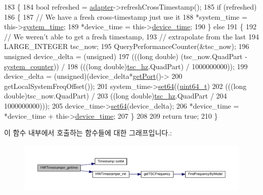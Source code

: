 \begin{DoxyCode}
183 \{
184     \textcolor{keywordtype}{bool} refreshed = \hyperlink{structadapter}{adapter}->refreshCrossTimestamp();
185     \textcolor{keywordflow}{if} (refreshed)
186     \{
187         \textcolor{comment}{// We have a fresh cross-timestamp just use it}
188         *system\_time = this->\hyperlink{class_windows_wireless_timestamper_a12dbc1e510ed1eb316f94c04fcf7d991}{system\_time};
189         *device\_time = this->\hyperlink{class_windows_wireless_timestamper_a095474901dd00b446c5c1b7da2e354aa}{device\_time};
190     \} \textcolor{keywordflow}{else}
191     \{
192         \textcolor{comment}{// We weren't able to get a fresh timestamp,}
193         \textcolor{comment}{// extrapolate from the last}
194         LARGE\_INTEGER tsc\_now;
195         QueryPerformanceCounter(&tsc\_now);
196         \textcolor{keywordtype}{unsigned} device\_delta = (unsigned)
197             (((\textcolor{keywordtype}{long} \textcolor{keywordtype}{double}) (tsc\_now.QuadPart - \hyperlink{class_windows_wireless_timestamper_a6cb20ab38891e33e6db7431f500b1ff1}{system\_counter})) /
198              (((\textcolor{keywordtype}{long} double)\hyperlink{class_windows_wireless_timestamper_a259066718bc34c6231bbefd0b7093b6e}{tsc\_hz}.QuadPart) / 1000000000));
199         device\_delta = (unsigned)(device\_delta*\hyperlink{class_wireless_timestamper_aad42db1d6ccc40f2bebc5ba544d738d8}{getPort}()->
200                       getLocalSystemFreqOffset());
201         system\_time->\hyperlink{class_timestamp_aa62b073d8565fc6536122e8c27351f5c}{set64}((\hyperlink{parse_8c_aec6fcb673ff035718c238c8c9d544c47}{uint64\_t})
202                    (((\textcolor{keywordtype}{long} \textcolor{keywordtype}{double})tsc\_now.QuadPart) /
203                     ((\textcolor{keywordtype}{long} \textcolor{keywordtype}{double})\hyperlink{class_windows_wireless_timestamper_a259066718bc34c6231bbefd0b7093b6e}{tsc\_hz}.QuadPart /
204                      1000000000)));
205         device\_time->\hyperlink{class_timestamp_aa62b073d8565fc6536122e8c27351f5c}{set64}(device\_delta);
206         *device\_time = *device\_time + this->\hyperlink{class_windows_wireless_timestamper_a095474901dd00b446c5c1b7da2e354aa}{device\_time};
207     \}
208 
209     \textcolor{keywordflow}{return} \textcolor{keyword}{true};
210 \}
\end{DoxyCode}


이 함수 내부에서 호출하는 함수들에 대한 그래프입니다.\+:
\nopagebreak
\begin{figure}[H]
\begin{center}
\leavevmode
\includegraphics[width=350pt]{class_windows_wireless_timestamper_ab8370a996dbc05b111b5d8f888a87648_cgraph}
\end{center}
\end{figure}




